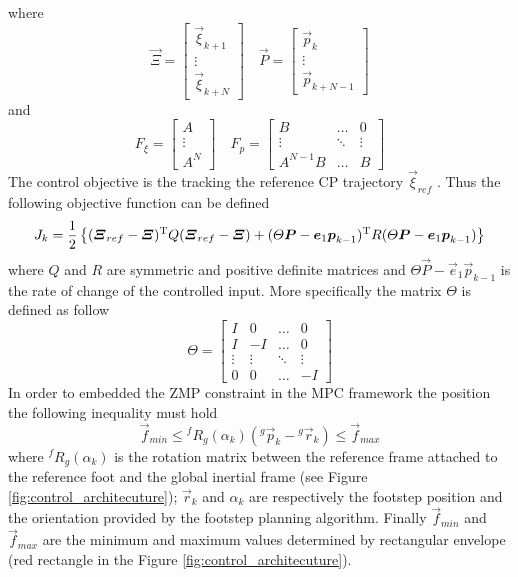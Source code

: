 where
\[
\vec{\Xi} =
\begin{bmatrix}
  \vec{\xi}_{k+1}\\
  \vdots\\
  \vec{\xi}_{k+N}
\end{bmatrix} \quad
\vec{P} =
\begin{bmatrix}
  \vec{p}_{k}\\
  \vdots\\
  \vec{p}_{k+N-1}
\end{bmatrix}
\]
and
\[
F_{\xi} =
\begin{bmatrix}
  A\\
  \vdots\\
  A^N
\end{bmatrix} \quad
F_p =
\begin{bmatrix}
  B & \hdots & 0\\
  \vdots &\ddots & \vdots\\
  A^{N-1} B & \hdots & B
\end{bmatrix}
\]
The control objective is the tracking the reference CP trajectory $\vec{\xi}_{ref}$ .
Thus the following objective function can be defined
\[
J_k = \frac{1}{2} \left\{  (\boldsymbol{\Xi}_{ref} - \boldsymbol{\Xi})^{\mathrm{T}} Q (\boldsymbol{\Xi}_{ref} - \boldsymbol{\Xi}) +
(\Theta \boldsymbol{P} - \boldsymbol{e}_1 \boldsymbol{p}_{k-1}) ^{\mathrm{T}} R (\Theta \boldsymbol{P} - \boldsymbol{e}_1 \boldsymbol{p}_{k-1}) \right\}
\]
where $Q$ and $R$ are symmetric and positive definite matrices and $\Theta \vec{P} - \vec{e}_1 \vec{p}_{k-1}$ is the rate of change of the controlled input. More specifically the matrix $\Theta$ is
defined as follow
\[
\Theta =
\begin{bmatrix}
  I & 0 & \hdots & 0 \\
  I & -I & \hdots & 0 \\
  \vdots & \vdots & \ddots & \vdots \\
  0 & 0 & \hdots & -I
\end{bmatrix}
\]
In order to embedded the ZMP constraint in the MPC framework the position the following inequality
must hold
\[
\vec{f}_{min} \le {}^f R_g(\alpha_k) ({}^g \vec{p}_k - {}^ g \vec{r}_k) \le \vec{f}_{max}
\]
where ${}^f R_g(\alpha_k)$ is the rotation matrix between the reference frame attached to the
reference foot and the global inertial frame (see Figure \ref{fig:control_architecuture});
$\vec{r}_k$ and $\alpha_k$ are respectively the footstep position and the orientation provided
by the footstep planning algorithm. Finally $\vec{f}_{min}$ and $\vec{f}_{max}$ are the minimum and
maximum values determined by rectangular envelope (red rectangle in the Figure \ref{fig:control_architecuture}).
